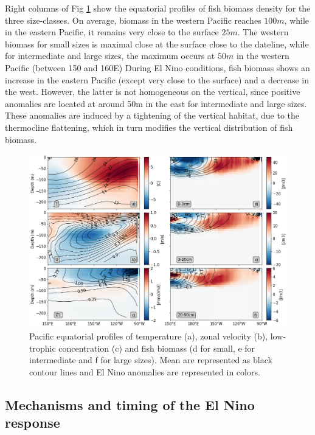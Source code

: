 Right columns of Fig \ref{fig:profiles} show the equatorial profiles of fish biomass density for the three size-classes. On average, biomass in the western Pacific reaches $100m$, while in the eastern Pacific, it remains very close to the surface $25m$. The western biomass for small sizes is maximal close at the surface close to the dateline, while for intermediate and large sizes, the maximum occurs at $50m$ in the western Pacific (between 150 and 160\degree{}E)
During El Nino conditions, fish biomass shows an increase in the eastern Pacific (except very close to the surface) and a decrease in the west. However, the latter is not homogeneous on the vertical, since positive anomalies are located at around 50m in the east for intermediate and large sizes. These anomalies are induced by a tightening of the vertical habitat, due to the thermocline flattening, which in turn modifies the vertical distribution of fish biomass.

\begin{figure}[h!tp]
	\centering
	\includegraphics[scale=0.4]{figs/forage_mean_ond97.png}	
	\caption{Pacific equatorial profiles of temperature (a), zonal velocity (b), low-trophic concentration (c) and fish biomass (d for small, e for intermediate and f for large sizes). Mean are represented as black contour lines and El Nino anomalies are represented in colors.}	
	\label{fig:profiles}
\end{figure}

\subsection{Mechanisms and timing of the El Nino response}


